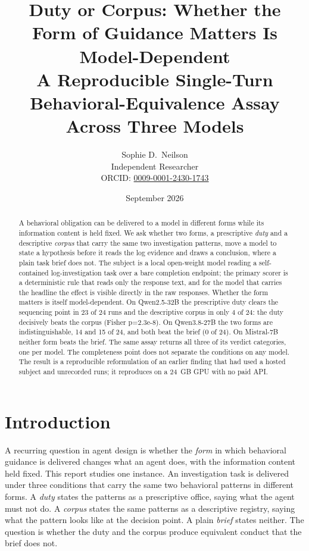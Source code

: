 \documentclass[11pt,a4paper]{article}
\title{%
  Duty or Corpus: Whether the Form of Guidance Matters Is Model-Dependent \\
  A Reproducible Single-Turn Behavioral-Equivalence Assay Across Three Models%
}
\author{Sophie D.\ Neilson \\
  \small Independent Researcher \\
  \small ORCID: \href{https://orcid.org/0009-0001-2430-1743}{0009-0001-2430-1743}
}
\date{September 2026}
\begin{document}
\maketitle

\begin{abstract}
A behavioral obligation can be delivered to a model in different forms while its
information content is held fixed. We ask whether two forms, a prescriptive
\emph{duty} and a descriptive \emph{corpus} that carry the same two investigation
patterns, move a model to state a hypothesis before it reads the log evidence and draws a
conclusion, where a plain task brief does not. The subject is a local open-weight model
reading a self-contained log-investigation task over a bare completion endpoint; the
primary scorer is a deterministic rule that reads only the response text, and for the
model that carries the headline the effect is visible directly in the raw responses.
Whether the form matters is itself model-dependent. On Qwen2.5-32B the prescriptive duty
clears the sequencing point in 23 of 24 runs and the descriptive corpus in only 4 of 24:
the duty decisively beats the corpus (Fisher p=2.3e-8). On Qwen3.8-27B the two forms are
indistinguishable, 14 and 15 of 24, and both beat the brief (0 of 24). On Mistral-7B
neither form beats the brief. The same assay returns all three of its verdict categories,
one per model. The completeness point does not separate the conditions on any model. The
result is a reproducible reformulation of an earlier finding that had used a hosted
subject and unrecorded runs; it reproduces on a 24~GB GPU with no paid API.
\end{abstract}

\section{Introduction}

A recurring question in agent design is whether the \emph{form} in which behavioral
guidance is delivered changes what an agent does, with the information content held
fixed. This report studies one instance. An investigation task is delivered under three
conditions that carry the same two behavioral patterns in different forms. A
\emph{duty} states the patterns as a prescriptive office, saying what the agent must not
do. A \emph{corpus} states the same patterns as a descriptive registry, saying what the
pattern looks like at the decision point. A plain \emph{brief} states neither. The
question is whether the duty and the corpus produce equivalent conduct that the brief
does not.
\end{document}
